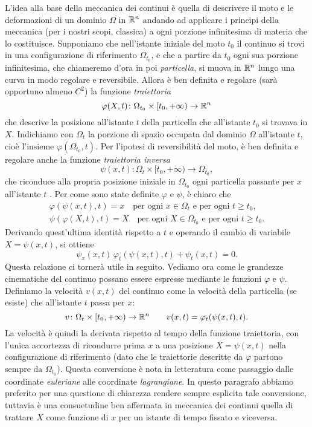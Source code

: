 L'idea alla base della meccanica dei continui è quella di
descrivere il moto e le deformazioni di un dominio
$\Omega$ in $\mathbb{R}^n$ andando ad applicare i principi della meccanica
(per i nostri scopi, classica) a ogni porzione infinitesima di materia
che lo costituisce.
Supponiamo che nell'istante iniziale del moto $t_0$ il continuo si trovi in
una configurazione di riferimento $\Omega_{t_0}$, e che
a partire da $t_0$ ogni sua porzione infinitesima,
che chiameremo d'ora in poi \emph{particella},
si muova in $\mathbb{R}^n$ lungo una curva in modo regolare e reversibile.
Allora è ben definita e regolare (sarà opportuno almeno $C^2$) la funzione \emph{traiettoria}
\[
\varphi(X,t) \colon \Omega_{t_0} \times [t_0,+\infty) \to \mathbb{R}^n
\]
che descrive la posizione all'istante $t$ della particella
che all'istante $t_0$ si trovava in $X$.
Indichiamo con $\Omega_t$ la porzione di spazio occupata dal dominio
$\Omega$ all'istante $t$, cioè l'insieme $\varphi(\Omega_{t_0},t)$.
Per l'ipotesi di reversibilità del moto, è ben definita e regolare anche la funzione
\emph{traiettoria inversa}
\[
\psi(x,t) \colon \Omega_t \times [t_0,+\infty) \to \Omega_{t_0},
\]
che riconduce alla propria posizione iniziale in $\Omega_{t_0}$
ogni particella passante per $x$ all'istante $t$ .
Per come sono state definite $\varphi$ e $\psi$, è chiaro che
\begin{gather*}
\varphi(\psi(x,t),t) = x
\quad \text{per ogni $x \in \Omega_t$ e per ogni $t \geq t_0$,} \\
\psi(\varphi(X,t),t) = X
\quad \text{per ogni $X \in \Omega_{t_0}$ e per ogni $t \geq t_0$.}
\end{gather*}
Derivando quest'ultima identità rispetto a $t$
e operando il cambio di variabile $X = \psi(x,t)$, si ottiene
\begin{equation} \label{eq:phi-psi-funzione-inversa}
\psi_x(x,t) \, \varphi_t(\psi(x,t),t) + \psi_t(x,t) = 0.
\end{equation}
Questa relazione ci tornerà utile in seguito.
Vediamo ora come le grandezze cinematiche del continuo
possano essere espresse mediante le funzioni $\varphi$ e $\psi$.
Definiamo la velocità $v(x,t)$ del continuo come la velocità
della particella (se esiste) che all'istante $t$ passa per $x$:
\[
v \colon \Omega_t \times [t_0,+\infty) \to \mathbb{R}^n
\qquad v(x,t) = \varphi_t(\psi(x,t),t).
\]
La velocità è quindi la derivata rispetto al tempo della funzione traiettoria,
con l'unica accortezza di ricondurre prima $x$
a una posizione $X = \psi(x,t)$ nella configurazione di riferimento
(dato che le traiettorie descritte da $\varphi$ partono sempre da $\Omega_{t_0}$).
Questa conversione è nota in letteratura come passaggio dalle
coordinate \emph{euleriane} alle coordinate \emph{lagrangiane}.
In questo paragrafo abbiamo preferito per una questione di chiarezza
rendere sempre esplicita tale conversione, tuttavia è una consuetudine
ben affermata in meccanica dei continui quella di trattare $X$ come
funzione di $x$ per un istante di tempo fissato e viceversa.

